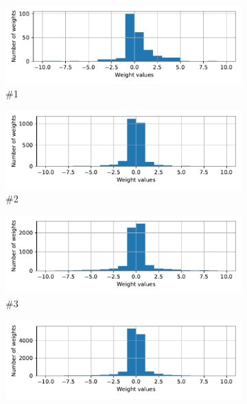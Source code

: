 \documentclass{article}
\begin{document}
\begin{figure}
    \centering
    \begin{subfigure}{0.48\linewidth}
        \centering
        \includegraphics[width=\linewidth]{hist_layer1}
        \caption{ \#1}
    \end{subfigure}
    \hfill
    \begin{subfigure}{0.48\linewidth}
        \centering
        \includegraphics[width=\linewidth]{hist_layer2}
        \caption{ \#2}
    \end{subfigure}
    \begin{subfigure}{0.48\linewidth}
        \centering
        \includegraphics[width=\linewidth]{hist_layer3}
        \caption{ \#3}
    \end{subfigure}
    \hfill
    \begin{subfigure}{0.48\linewidth}
        \centering
        \includegraphics[width=\linewidth]{hist_layer4}

\end{subfigure}
\end{figure}
\end{document}
